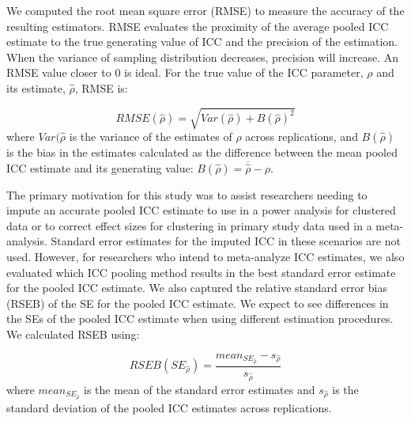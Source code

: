 We computed the root mean square error (RMSE) to measure the accuracy of the resulting estimators. RMSE evaluates the proximity of the average pooled ICC estimate to the true generating value of ICC and the precision of the estimation. When the variance of sampling distribution decreases, precision will increase. An RMSE value closer to 0 is ideal. For the true value of the ICC parameter, $\rho$ and its estimate, $\hat{\rho}$, RMSE is:


\begin{equation}
  RMSE(\hat{\rho}) = \sqrt{Var(\hat{\rho})+B(\hat{\rho})^2}
\end{equation}
where $Var(\hat{\rho}$ is the variance of the estimates of $\rho$ across replications, and $B(\hat\rho)$ is the bias in the estimates calculated as the difference between the mean pooled ICC estimate and its generating value: $B(\hat\rho)=\overline{\hat{\rho}} - \rho$.

The primary motivation for this study was to assist researchers needing to impute an accurate pooled ICC estimate to use in a power analysis for clustered data or to correct effect sizes for clustering in primary study data used in a meta-analysis. Standard error estimates for the imputed ICC in these scenarios are not used. However, for researchers who intend to meta-analyze ICC estimates, we also evaluated which ICC pooling method results in the best standard error estimate for the pooled ICC estimate. We also captured the relative standard error bias (RSEB) of the SE for the pooled ICC estimate. We expect to see  differences in the SEs of the pooled ICC estimate when using different estimation procedures. We calculated RSEB using:

\begin{equation}
    RSEB(SE_{\hat{\rho}}) = \frac{ mean_{SE_{\hat{\rho}}} - s_{\hat{\rho}}  }{s_{\hat{\rho}}}
\end{equation}
where $mean_{SE_{\hat{\rho}}}$ is the mean of the standard error estimates and $s_{\hat{\rho}}$ is the standard deviation of the pooled ICC estimates across replications. 



